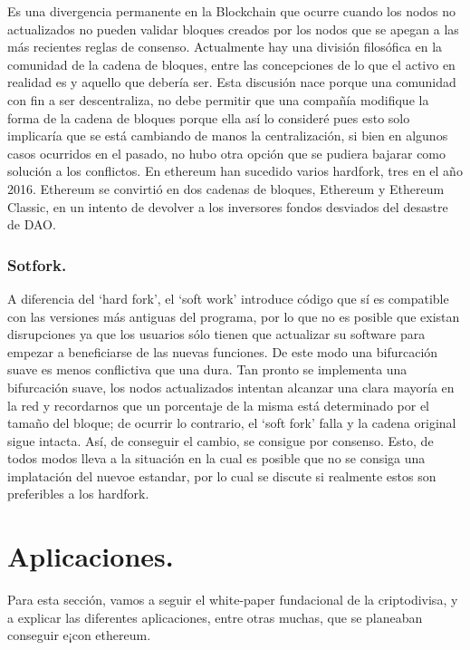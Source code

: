 \documentclass[11pt,a4paper]{article}
\begin{document}
\label{sec:hardfork}
Es una divergencia permanente en la Blockchain que ocurre cuando los nodos no actualizados no pueden validar bloques creados por los nodos que se apegan a las más recientes reglas de consenso. Actualmente hay una división filosófica en la comunidad  de la cadena de bloques, entre las concepciones de lo que el activo en realidad es y aquello que debería ser. Esta discusión nace porque una comunidad con fin a ser descentraliza, no debe permitir que una compañía modifique la forma de la cadena de bloques porque ella así lo consideré pues esto solo implicaría que se está cambiando de manos la centralización, si bien en algunos casos ocurridos en el pasado, no hubo otra opción que se pudiera bajarar como solución a los conflictos. En ethereum han sucedido varios hardfork, tres en el año 2016. Ethereum se convirtió en dos cadenas de bloques, Ethereum y Ethereum Classic, en un intento de devolver a los inversores fondos desviados del desastre de DAO.\\

\subsubsection{Sotfork.}
A diferencia del ‘hard fork’, el ‘soft work’ introduce código que sí es compatible con las versiones más antiguas del programa, por lo que no es posible que existan disrupciones ya que los usuarios sólo tienen que actualizar su software para empezar a beneficiarse de las nuevas funciones. De este modo una bifurcación suave es menos conflictiva que una dura.  Tan pronto se implementa una bifurcación suave, los nodos actualizados intentan alcanzar una clara mayoría en la red y recordarnos que un porcentaje de la misma está determinado por el tamaño del bloque; de ocurrir lo contrario, el ‘soft fork’ falla y la cadena original sigue intacta. Así, de conseguir el cambio, se consigue por consenso. Esto, de todos modos lleva a la situación en la cual es posible que no se consiga una implatación del nuevoe estandar, por lo cual se discute si realmente estos son preferibles a los hardfork.

\section {Aplicaciones.} 
Para esta sección, vamos a seguir el white-paper fundacional de la criptodivisa, y a explicar las diferentes aplicaciones, entre otras muchas, que se planeaban conseguir e¡con ethereum.\\
\end{document}
